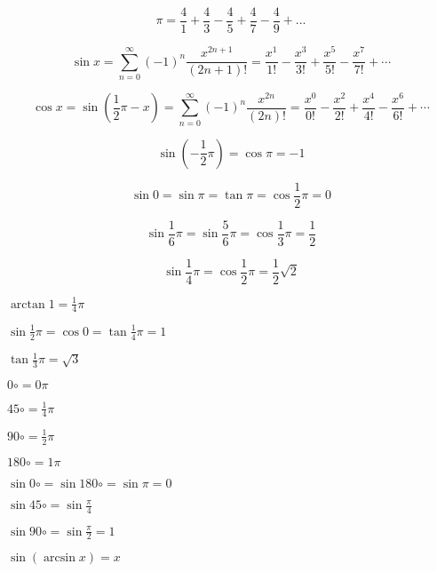 \documentclass{article}
\begin{document}
\[\pi = \frac{4}{1} + \frac{4}{3} - \frac{4}{5} + \frac{4}{7} - \frac{4}{9} + ...\]

\[\sin x = \sum_{n=0}^{\infty}(-1)^n\frac{x^{2n+1}}{(2n+1)!} =
\frac{x^1}{1!} - \frac{x^3}{3!} + \frac{x^5}{5!} - \frac{x^7}{7!} + \cdots\]

\[ \cos x = \sin(\frac{1}{2}\pi - x) = \sum_{n=0}^{\infty}(-1)^n\frac{x^{2n}}{(2n)!} =
\frac{x^0}{0!} - \frac{x^2}{2!} + \frac{x^4}{4!} - \frac{x^6}{6!} + \cdots\]

\hrulefill

\[\sin(-\frac{1}{2}\pi) = \cos\pi = -1\]

\[\sin0 = \sin\pi = \tan\pi = \cos\frac{1}{2}\pi = 0\]

\[\sin\frac{1}{6}\pi = \sin\frac{5}{6}\pi = \cos\frac{1}{3}\pi = \frac{1}{2}\]

\[\sin\frac{1}{4}\pi = \cos\frac{1}{2}\pi = \frac{1}{2}\sqrt{2}\]

$\arctan{1} = \frac{1}{4}\pi$

$\sin\frac{1}{2}\pi = \cos0 = \tan\frac{1}{4}\pi = 1$

$\tan\frac{1}{3}\pi = \sqrt{3}$

\hrulefill

$0\circ = 0\pi$

$45\circ = \frac{1}{4}\pi$

$90\circ = \frac{1}{2}\pi$

$180\circ = 1\pi$

\hrulefill

$\sin 0\circ = \sin 180\circ = \sin\pi = 0$

$\sin 45\circ = \sin\frac{\pi}{4}$

$\sin 90\circ = \sin\frac{\pi}{2} = 1$

$\sin(\arcsin x) = x$

\hrulefill
\end{document}
